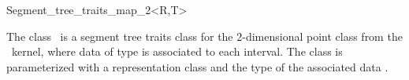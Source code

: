 \begin{ccRefClass} {Segment_tree_traits_map_2<R,T>}

\ccDefinition
The class \ccClassName\ is a segment tree traits class for the
2-dimensional point class from the \cgal\ kernel, where data of
type  is associated to each interval. The class is
parameterized with a representation class  and the type of
the associated data .


\ccTypes
{}


\end{ccRefClass} 
